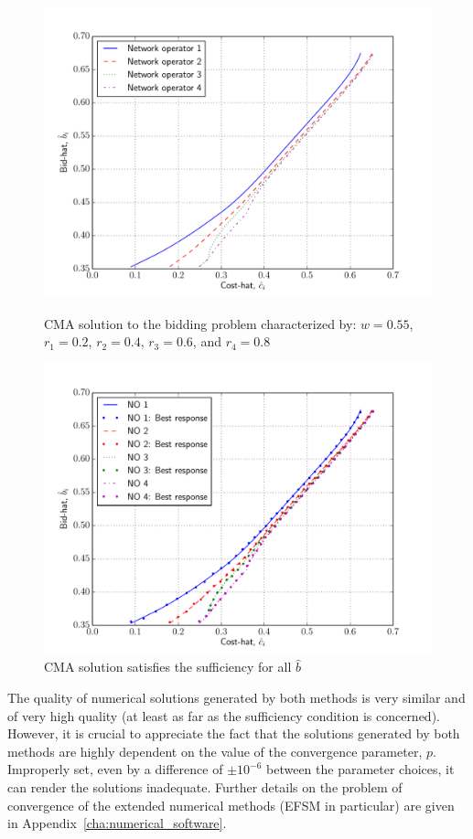 \begin{figure}[p!]
  \includegraphics[width=\figsize]{Indirect/Figures/combined_4}
  \caption{CMA solution to the bidding problem characterized by: $w=0.55$, $r_1 = 0.2$, $r_2 = 0.4$, $r_3 = 0.6$, and $r_4 = 0.8$}
  \label{fig:combined_4_indirect}
  \vspace{10mm}
  \includegraphics[width=\figsize]{Indirect/Figures/combined_4_sufficiency}
  \caption{CMA solution satisfies the sufficiency for all $\hat{b}$}
  \label{fig:combined_4_sufficiency_indirect}
\end{figure}

The quality of numerical solutions generated by both methods is very similar and of very high quality (at least as far as the sufficiency condition is concerned). However, it is crucial to appreciate the fact that the solutions generated by both methods are highly dependent on the value of the convergence parameter, $p$. Improperly set, even by a difference of $\pm 10^{-6}$ between the parameter choices, it can render the solutions inadequate. Further details on the problem of convergence of the extended numerical methods (EFSM in particular) are given in Appendix~\ref{cha:numerical_software}.

